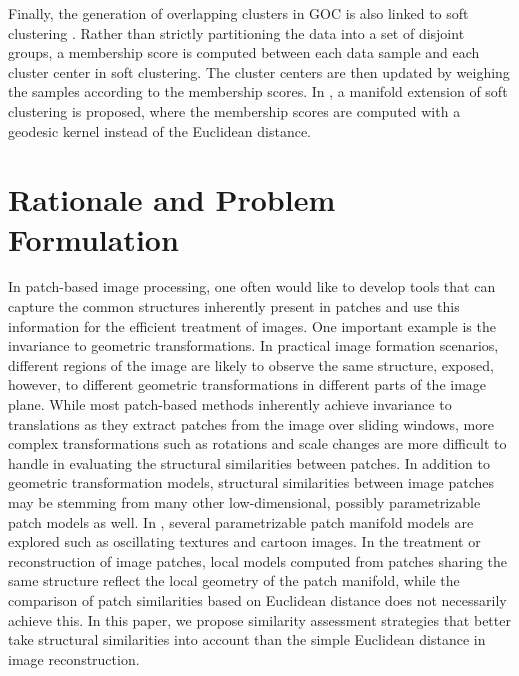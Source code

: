 \documentclass[journal]{IEEEtran}
\begin{document}
Finally, the generation of overlapping clusters in GOC is also linked to soft clustering \cite{Bezdek1984}. Rather than strictly partitioning the data into a set of disjoint groups, a membership score is computed between each data sample and each cluster center in soft clustering. The cluster centers are then updated by weighing the samples according to the membership scores. In \cite{Kim07soft}, a manifold extension of soft clustering is proposed, where the membership scores are computed with a geodesic kernel instead of the Euclidean distance. 








 
\section{Rationale and Problem Formulation}
\label{sec:problem}

In patch-based image processing, one often would like to develop tools that can capture the common structures inherently present in patches and use this information for the efficient treatment of images. One important example is the invariance to geometric transformations. In practical image formation scenarios, different regions of the image are likely to observe the same structure, exposed, however, to different geometric transformations in different parts of the image plane. While most patch-based methods inherently achieve invariance to translations as they extract patches from the image over sliding windows, more complex transformations such as rotations and scale changes are more difficult to handle in evaluating the structural similarities between patches. In addition to geometric transformation models, structural similarities between image patches may be stemming from many other low-dimensional, possibly parametrizable patch models as well. In \cite{Peyre09manifold}, several parametrizable patch manifold models are explored such as oscillating textures and cartoon images. In the treatment or reconstruction of image patches, local models computed from patches sharing the same structure reflect the local geometry of the patch manifold, while the comparison of patch similarities based on Euclidean distance does not necessarily achieve this. In this paper, we propose similarity assessment strategies that better take  structural similarities into account than the simple Euclidean distance in image reconstruction.
\end{document}
